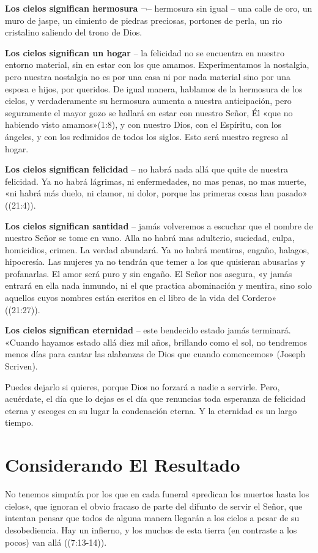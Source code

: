 \documentclass[12pt, twoside, openright]{book}
\begin{document}
\textbf{Los cielos significan hermosura} ¬– hermosura sin igual – una calle de oro, un muro de jaspe, un cimiento de piedras preciosas, portones de perla, un rio cristalino saliendo del trono de Dios.

\textbf{Los cielos significan un hogar} – la felicidad no se encuentra en nuestro entorno material, sin en estar con los que amamos. Experimentamos la nostalgia, pero nuestra nostalgia no es por una casa ni por nada material sino por una esposa e hijos, por queridos. De igual manera, hablamos de la hermosura de los cielos, y verdaderamente su hermosura aumenta a nuestra anticipación, pero seguramente el mayor gozo se hallará en estar con nuestro Señor, Él «que no habiendo visto amamos»(1:8), y con nuestro Dios, con el Espíritu, con los ángeles, y con los redimidos de todos los siglos. Esto será nuestro regreso al hogar.

\textbf{Los cielos significan felicidad} – no habrá nada allá que quite de nuestra felicidad. Ya no habrá lágrimas, ni enfermedades, no mas penas, no mas muerte, «ni habrá más duelo, ni clamor, ni dolor, porque las primeras cosas han pasado» ((21:4)). 

\textbf{Los cielos significan santidad} – jamás volveremos a escuchar que el nombre de nuestro Señor se tome en vano. Alla no habrá mas adulterio, suciedad, culpa, homicidios, crimen. La verdad abundará. Ya no habrá mentiras, engaño, halagos, hipocresía. Las mujeres ya no tendrán que temer a los que quisieran abusarlas y profanarlas. El amor será puro y sin engaño. El Señor nos asegura, «y jamás entrará en ella nada inmundo, ni el que practica abominación y mentira, sino solo aquellos cuyos nombres están escritos en el libro de la vida del Cordero» ((21:27)).

\textbf{Los cielos significan eternidad} – este bendecido estado jamás terminará. «Cuando hayamos estado allá diez mil años, brillando como el sol, no tendremos menos días para cantar las alabanzas de Dios que cuando comencemos» (Joseph Scriven).

Puedes dejarlo si quieres, porque Dios no forzará a nadie a servirle. Pero, acuérdate, el día que lo dejas es el día que renuncias toda esperanza de felicidad eterna y escoges en su lugar la condenación eterna. Y la eternidad es un largo tiempo.

\section{Considerando El Resultado}
No tenemos simpatía por los que en cada funeral «predican los muertos hasta los cielos», que ignoran el obvio fracaso de parte del difunto de servir el Señor, que intentan pensar que todos de alguna manera llegarán a los cielos a pesar de su desobediencia. Hay un infierno, y los muchos de esta tierra (en contraste a los pocos) van allá ((7:13-14)).
\end{document}
